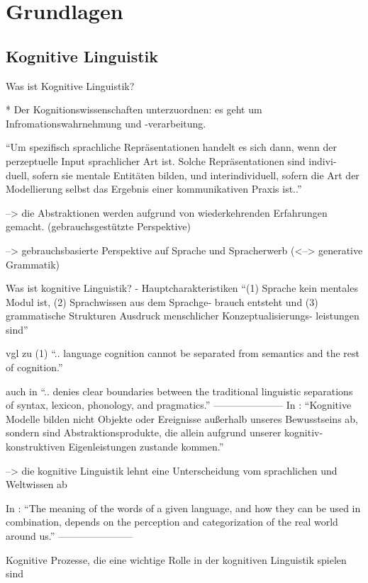 \section{Grundlagen}

\subsection{Kognitive Linguistik}
Was ist Kognitive Linguistik?

* Der Kognitionswissenschaften unterzuordnen: es geht um Infromationswahrnehmung und -verarbeitung.

\cite{Ziem08}``Um spezifisch sprachliche Repräsentationen handelt es sich dann, wenn der
perzeptuelle Input sprachlicher Art ist. Solche Repräsentationen sind indivi-
duell, sofern sie mentale Entitäten bilden, und interindividuell, sofern die Art
der Modellierung selbst das Ergebnis einer kommunikativen Praxis ist..''

--> die Abstraktionen werden aufgrund von wiederkehrenden Erfahrungen gemacht. (gebrauchsgestützte Perspektive)

--> gebrauchsbasierte Perspektive auf Sprache und Spracherwerb (<--> generative Grammatik)


Was ist kognitive Linguistik? - Hauptcharakteristiken
\cite{Ziem13} ``(1) Sprache kein mentales Modul ist, (2) Sprachwissen aus dem Sprachge-
brauch entsteht und (3) grammatische Strukturen Ausdruck menschlicher Konzeptualisierungs-
leistungen sind''

vgl zu (1) \cite{Ellis08}
``.. language cognition cannot be separated from semantics and the rest of cognition.''

auch in \cite{Ellis08}
``.. denies clear boundaries between the traditional linguistic separations of syntax, lexicon, phonology, and pragmatics.''
---------------------
In \cite{Ziem08}: ``Kognitive Modelle bilden nicht Objekte oder Ereignisse außerhalb unseres
Bewusstseins ab, sondern sind Abstraktionsprodukte, die allein aufgrund
unserer kognitiv-konstruktiven Eigenleistungen zustande kommen.''

--> die kognitive Linguistik lehnt eine Unterscheidung vom sprachlichen und Weltwissen ab


In \cite{Ellis08}: ``The meaning of the words of a given language, and how they can be used in combination, depends on the perception and categorization of the real world around us.''
-----------------------

Kognitive Prozesse, die eine wichtige Rolle in der kognitiven Linguistik spielen sind

